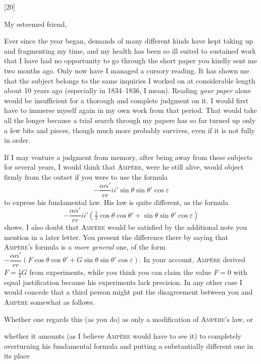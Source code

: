 \begin{center}[20]\par{}\end{center}
My esteemed friend,

Ever since the year began, demands of many different kinds have kept taking up and fragmenting my time, and my health has been so ill suited to sustained work that I have had no opportunity to go through the short paper you kindly sent me two months ago. Only now have I managed a cursory reading. It has shown me that the subject belongs to the same inquiries I worked on at considerable length about 10 years ago (especially in 1834–1836, I mean). Reading \textit{your paper} alone would be insufficient for a thorough and complete judgment on it. I would first have to immerse myself again in my own work from that period. That would take all the longer because a trial search through my papers has so far turned up only a few bits and pieces, though much more probably survives, even if it is not fully in order.

If I may venture a judgment from memory, after being away from these subjects for several years, I would think that \textsc{Ampère}, were he still alive, would object firmly from the outset if you were to use the formula
\[
-\frac{\alpha\alpha'}{rr}ii'\sin\theta\sin\theta'\cos\varepsilon\tag*{(I)}
\]
to express his fundamental law. His law is quite different, as the formula
\[
-\frac{\alpha\alpha'}{rr}ii'\left(\tfrac12\cos\theta\cos\theta'+\sin\theta\sin\theta'\cos\varepsilon\right)\tag*{(II)}
\]
shows. I also doubt that \textsc{Ampère} would be satisfied by the additional note you mention in a later letter. You present the difference there by saying that \textsc{Ampère}’s formula is a \textit{more general} one, of the form \mbox{$-\dfrac{\alpha\alpha'}{rr}(F\cos\theta\cos\theta'+G\sin\theta\sin\theta'\cos\varepsilon)$}. In your account, \textsc{Ampère} derived $F=\tfrac12G$ from experiments, while you think you can claim the value $F=0$ with equal justification because his experiments lack precision. In any other case I would concede that a third person might put the disagreement between you and \textsc{Ampère} somewhat as follows.

Whether one regards this (as you do) as only a modification of \textsc{Ampère}’s law, or

whether it amounts (as I believe \textsc{Ampère} would have to see it) to completely overturning his fundamental formula and putting a substantially different one in its place

